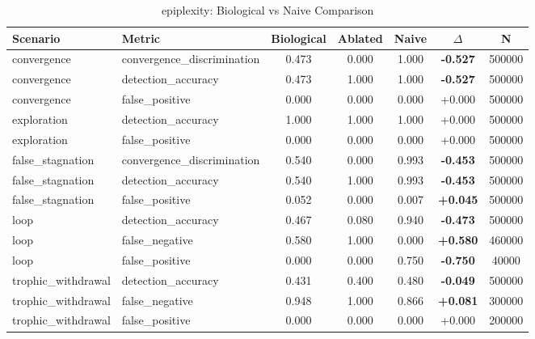 \begin{table}[h]
\caption{epiplexity: Biological vs Naive Comparison}
\centering
\begin{tabular}{llccccc}
\toprule
Scenario & Metric & Biological & Ablated & Naive & $\Delta$ & N \\
\midrule
convergence & convergence\_discrimination & 0.473 & 0.000 & 1.000 & \textbf{-0.527} & 500000 \\
convergence & detection\_accuracy & 0.473 & 1.000 & 1.000 & \textbf{-0.527} & 500000 \\
convergence & false\_positive & 0.000 & 0.000 & 0.000 & +0.000 & 500000 \\
exploration & detection\_accuracy & 1.000 & 1.000 & 1.000 & +0.000 & 500000 \\
exploration & false\_positive & 0.000 & 0.000 & 0.000 & +0.000 & 500000 \\
false\_stagnation & convergence\_discrimination & 0.540 & 0.000 & 0.993 & \textbf{-0.453} & 500000 \\
false\_stagnation & detection\_accuracy & 0.540 & 1.000 & 0.993 & \textbf{-0.453} & 500000 \\
false\_stagnation & false\_positive & 0.052 & 0.000 & 0.007 & \textbf{+0.045} & 500000 \\
loop & detection\_accuracy & 0.467 & 0.080 & 0.940 & \textbf{-0.473} & 500000 \\
loop & false\_negative & 0.580 & 1.000 & 0.000 & \textbf{+0.580} & 460000 \\
loop & false\_positive & 0.000 & 0.000 & 0.750 & \textbf{-0.750} & 40000 \\
trophic\_withdrawal & detection\_accuracy & 0.431 & 0.400 & 0.480 & \textbf{-0.049} & 500000 \\
trophic\_withdrawal & false\_negative & 0.948 & 1.000 & 0.866 & \textbf{+0.081} & 300000 \\
trophic\_withdrawal & false\_positive & 0.000 & 0.000 & 0.000 & +0.000 & 200000 \\
\bottomrule
\end{tabular}
\end{table}
